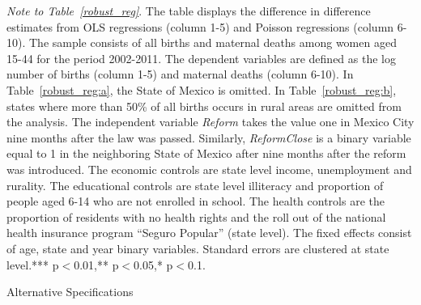 \documentclass[a4paper, 11pt]{article}
\begin{document}
\begin{spacing}{1.4}
\begin{table}
\begin{ThreePartTable}
    \begin{tablenotes} \tiny \item \textit{Note to Table~\ref{robust_reg}}. The table displays the difference in difference estimates from OLS regressions (column 1-5) and Poisson regressions (column 6-10). The sample consists of all births and maternal deaths among women aged 15-44 for the period 2002-2011. The dependent variables are defined as the log number of births (column 1-5) and maternal deaths (column 6-10). In Table~\ref{robust_reg:a}, the State of Mexico is omitted. In Table~\ref{robust_reg:b}, states where more than 50\% of all births occurs in rural areas are omitted from the analysis. The independent variable \textit{Reform} takes the value one in Mexico City nine months after the law was passed. Similarly, \textit{ReformClose} is a binary variable equal to 1 in the neighboring State of Mexico after nine months after the reform was introduced. The economic controls are state level income, unemployment and rurality. The educational controls are state level illiteracy and proportion of people aged 6-14 who are not enrolled in school. The health controls are the proportion of residents with no health rights and the roll out of the national health insurance program ``Seguro Popular'' (state level). The fixed effects consist of age, state and year binary variables. Standard errors are clustered at state level.*** p$<$0.01,** p$<$0.05,* p$<$0.1.	 
    \end{tablenotes} 
  \end{ThreePartTable}
\end{table}
 

\begin{table}\centering \caption{Alternative Specifications}\label{Alternative}
  \begin{ThreePartTable}
    \begin{subtable}{ 0.9  \textwidth}\centering {}\label{altspecRates}
      {\scriptsize 	}
    \end{subtable}%

    \begin{subtable}{ 0.9 \textwidth}\centering{}\label{OLS_levels}
      {\scriptsize 	}
    \end{subtable}%


\end{ThreePartTable}
\end{table}
\end{spacing}
\end{document}

